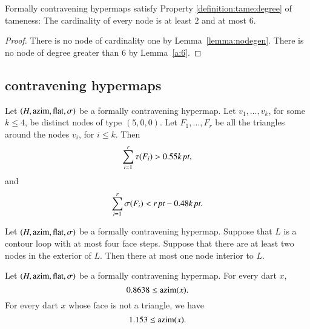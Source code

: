 \begin{lemma} 
Formally contravening hypermaps satisfy Property
\ref{definition:tame:degree} of tameness: The cardinality of every
node is at least $2$ and at most $6$.
\end{lemma}

\begin{proof}  There is no node of cardinality one by
Lemma~\ref{lemma:nodegen}.  There is no node of degree
greater than $6$ by Lemma~\ref{a:6}.
\end{proof}


\subsection{contravening hypermaps}


\begin{lemma} \label{lemma:0.55:bis} %
Let $(H,{\operatorname{azim}},\operatorname{flat},\sigma)$ be a formally contravening hypermap.
Let $v_1,\ldots, v_k$, for some $k\le 4$, be distinct nodes of type
$(5,0,0)$.  Let $F_1,\ldots, F_r$ be all the triangles around the
nodes $v_i$, for $i\le k$. Then
    $$
    \sum_{i=1}^r \tau(F_i)> 0.55k\,\hbox{\it pt},
    $$
and
    $$\sum_{i=1}^r \sigma(F_i) < r\,\hbox{\it pt} - 0.48k\,\hbox{\it pt}.$$
\end{lemma}


\begin{lemma}\label{lemma:no-2}
Let $(H,{\operatorname{azim}},\operatorname{flat},\sigma)$ be a formally contravening hypermap.
Suppose that $L$ is a contour loop with at most four face steps.
Suppose that there are at least two nodes in the exterior of $L$.
Then there at most one node interior to $L$.
\end{lemma}


\begin{lemma} \label{lemma:0.8638}
Let $(H,{\operatorname{azim}},\operatorname{flat},\sigma)$ be a formally contravening
hypermap. For every dart $x$,
    $$0.8638\le {\operatorname{azim}}(x).$$
For every dart $x$ whose face is not a triangle, we have
    $$1.153\le{\operatorname{azim}}(x).$$
\end{lemma}

